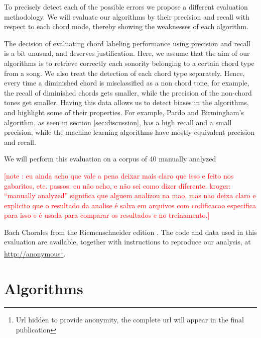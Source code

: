 \documentclass{article}
\newcounter{notecounter}
\newcommand{\note}[1]{
  \addtocounter{notecounter}{1}
  \textcolor{red}{[note \arabic{notecounter}: #1]}
}
\begin{document}
To precisely detect each of the possible errors we propose a different
evaluation methodology. We will evaluate our algorithms by their
precision and recall with respect to each chord mode, thereby showing
the weaknesses of each algorithm.

The decision of evaluating chord labeling performance using precision
and recall is a bit unusual, and deserves justification. Here, we
assume that the aim of our algorithms is to retrieve correctly each
sonority belonging to a certain chord type from a song. We also treat
the detection of each chord type separately. Hence, every time a
diminished chord is misclassified as a non chord tone, for example,
the recall of diminished chords gets smaller, while the precision of
the non-chord tones get smaller. Having this data allows us to detect
biases in the algorithms, and highlight some of their properties. For
example, Pardo and Birmingham's algorithm, as seen in section
\ref{sec:discussion}, has a high recall and a small precision, while
the machine learning algorithms have mostly equivalent precision and
recall.

We will perform this evaluation on a corpus of 40 manually analyzed
\note{eu ainda acho que vale a pena deixar mais claro que isso e feito
  nos gabaritos, etc. passos: eu não acho, e não sei como dizer
  diferente. kroger: ``manually analyzed'' significa que alguem
  analizou na mao, mas nao deixa claro e explicito que o resultado da
  analise é salva em arquivos com codificacao especifica para isso e é
usada para comparar os resultados e no treinamento.}
Bach Chorales from the Riemenschneider edition \cite{bach:371}. The
code and data used in this evaluation are available, together with
instructions to reproduce our analysis, at
\url{http://anonymous}\footnote{Url hidden to provide anonymity, the
  complete url will appear in the final publication}.

\section{Algorithms}
\label{sec:algorithms}
\end{document}
